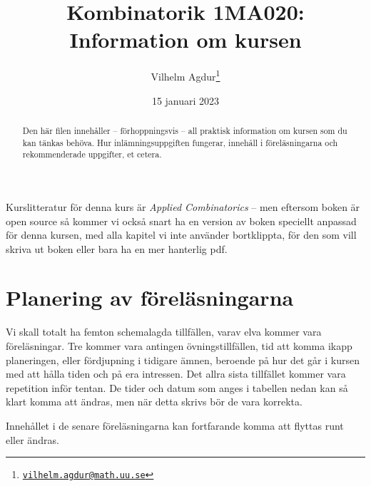 \documentclass{tufte-handout}
\title{Kombinatorik 1MA020: Information om kursen}
\author[Vilhelm Agdur]{Vilhelm Agdur\thanks{\href{mailto:vilhelm.agdur@math.uu.se}{\nolinkurl{vilhelm.agdur@math.uu.se}}}}
\date{15 januari 2023}
\begin{document}
\maketitle%

\begin{abstract}
\noindent
Den här filen innehåller -- förhoppningsvis -- all praktisk information om kursen som du kan tänkas behöva. Hur inlämningsuppgiften fungerar, innehåll
i föreläsningarna och rekommenderade uppgifter, et cetera. 
\end{abstract}

Kurslitteratur för denna kurs är \emph{Applied Combinatorics}\cite{mainTextbook} -- men eftersom boken är open source så kommer vi också snart ha en version av boken speciellt anpassad för denna kursen, med alla kapitel vi inte använder bortklippta, för den som vill skriva ut boken eller bara ha en mer hanterlig pdf.

\section{Planering av föreläsningarna}

Vi skall totalt ha femton schemalagda tillfällen, varav elva kommer vara föreläsningar. Tre kommer vara antingen övningstillfällen, tid att komma ikapp planeringen, eller fördjupning i tidigare ämnen, beroende på hur det går i kursen med att hålla tiden och på era intressen. Det allra sista tillfället kommer vara repetition inför tentan. De tider och datum som anges i tabellen nedan kan så klart komma att ändras, men när detta skrivs bör de vara korrekta.

Innehållet i de senare föreläsningarna kan fortfarande komma att flyttas runt eller ändras.
\end{document}
